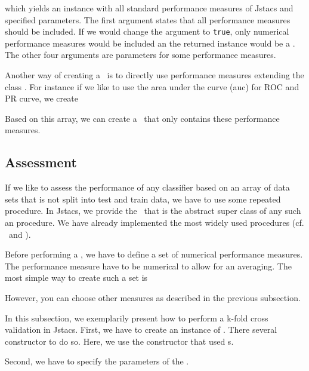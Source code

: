 which yields an instance with all standard performance measures of Jstacs and specified parameters. The first argument states that all performance measures should be included. If we would change the argument to \lstinline+true+, only numerical performance measures would be included an the returned instance would be a \NumericalPerformanceMeasureParameterSet. The other four arguments are parameters for some performance measures.

Another way of creating a \PerformanceMeasureParameterSet~is to directly use performance measures extending the class \AbstractPerformanceMeasure. For instance if we like to use the area under the curve (auc) for ROC and PR curve, we create 

\addtocounter{off}{1}

Based on this array, we can create a \PerformanceMeasureParameterSet~that only contains these performance measures.

\addtocounter{off}{1}

\subsection{Assessment}\label{Assessment}

If we like to assess the performance of any classifier based on an array of data sets that is not split into test and train data, we have to use some repeated procedure. In Jstacs, we provide the \ClassifierAssessment~that is the abstract super class of any such an procedure. We have already implemented the most widely used procedures (cf. \KFoldCrossValidation~and \RepeatedHoldOutExperiment).

Before performing a \ClassifierAssessment, we have to define a set of numerical performance measures. The performance measure have to be numerical to allow for an averaging. The most simple way to create such a set is
\addtocounter{off}{6}
However, you can choose other measures as described in the previous subsection.

In this subsection, we exemplarily present how to perform a k-fold cross validation in Jstacs. First, we have to create an instance of \KFoldCrossValidation. There several constructor to do so. Here, we use the constructor that used \AbstractClassifier s. 

\addtocounter{off}{2}

Second, we have to specify the parameters of the \KFoldCrossValidation.


